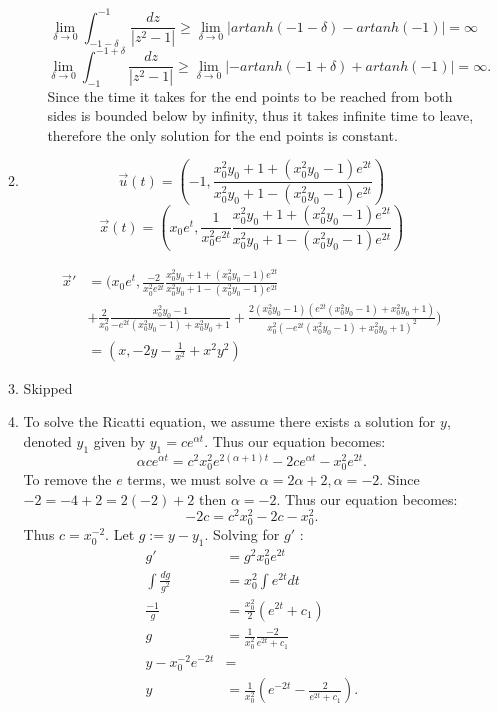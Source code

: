 \documentclass[12pt, letterpaper]{article}
\begin{document}
\begin{enumerate}
\begin{enumerate}
\begin{itemize}
				$$
				\lim_{\delta \to 0} \int_{-1-\delta}^{-1} \frac{dz}{|z^2-1|} \geq \lim_{\delta \to 0} |artanh(-1-\delta) - artanh(-1)| = \infty 
				$$
				$$
				\lim_{\delta \to 0} \int_{-1}^{-1+\delta} \frac{dz}{|z^2-1|} \geq \lim_{\delta \to 0} |-artanh(-1+\delta) + artanh(-1)| = \infty. 
				$$
				Since the time it takes for the end points to be reached from both sides is bounded below by infinity, thus it takes infinite time to leave, therefore the only solution for the end points is constant.   
			\end{itemize}			 
			\item 
			$$			
				\Vec{u}(t) = \left( -1,	\frac{x_0^2 y_0+1+(x_0^2 y_0-1)e^{2t}}{x_0^2 y_0+1-(x_0^2 y_0-1)e^{2t}}\right)		
			$$
			$$\Vec{x}(t) = \left( x_0 e^t, \displaystyle \frac{1}{x_0^2 e^{2t}}\frac{x_0^2 y_0+1+(x_0^2 y_0-1)e^{2t}}{x_0^2 y_0+1-(x_0^2 y_0-1)e^{2t}}\right)$$
			
				\begin{align*}
				\Vec{x}' &= (x_0 e^t, \frac{-2}{x_0^2 e^{2t}}\frac{x_0^2 y_0+1+(x_0^2 y_0-1)e^{2t}}{x_0^2 y_0+1-(x_0^2 y_0-1)e^{2t}}\\
				&+ \frac{2}{x_0^2}\frac{x_0^2 y_0 - 1}{-e^{2t}(x_0^2 y_0-1)+x_0^2 y_0+1}+\frac{2(x_0^2 y_0-1)(e^{2t}(x_0^2 y_0-1)+x_0^2 y_0+1)}{x_0^2(-e^{2t}(x_0^2 y_0-1)+x_0^2 y_0+1)^2})\\
				&= (x,-2y - \frac{1}{x^2} + x^2 y^2) 		
				\end{align*}
			\item Skipped
			\item To solve the Ricatti equation, we assume  there exists a solution for $y$, denoted $y_1$ given by $y_1 =c e^{\alpha t}$.  Thus our equation becomes:
			$$
			\alpha c e^{\alpha t} = c^2 x_0^2 e^{2(\alpha + 1)t} - 2 ce^{\alpha t} - x_0^2 e^{2t}.			
			$$
			To remove the $e$ terms, we must solve $\alpha = 2\alpha + 2, \alpha = -2$.  Since $-2 = -4 + 2 = 2(-2) + 2$ then $\alpha = -2$.  Thus our equation becomes:
			$$
			-2c = c^2 x_0^2 -2c -x_0^2.			
			$$
			Thus $c = x_0^{-2}$.  Let $g := y - y_1$.  Solving for $g'$ :
			\begin{align*}
				g' &= g^2 x_0^2 e^{2t}\\
				\int \frac{dg}{g^2} &= x_0^2 \int e^{2t}dt\\
				\frac{-1}{g} &= \frac{x_0^2}{2}(e^{2t} + c_1)\\
				g &= \frac{1}{x_0^2}\frac{-2}{e^{2t}+c_1}\\ 
				y - x_0^{-2}e^{-2t}  &= \\
				y &= \frac{1}{x_0^2} \left( e^{-2t} - \frac{2}{e^{2t}+c_1}\right).
			\end{align*}
			

\end{enumerate}
\end{enumerate}
\end{document}
